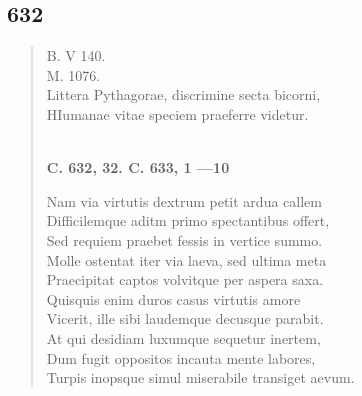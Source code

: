 \documentclass[11pt, a4paper]{report}
\begin{document}
            \subsection*{632}
      \begin{verse}
      B. V 140. \\ M. 1076. \\ Littera Pythagorae, discrimine secta bicorni, \\ HIumanae vitae speciem praeferre videtur. \\ 
        ﻿\pagebreak 
    \begin{center} \textbf{C. 632, 32. C. 633, 1 —10} \end{center} \marginpar{[99]} Nam via virtutis dextrum petit ardua callem \\ Difficilemque aditm primo spectantibus offert, \\ Sed requiem praebet fessis in vertice summo. \\ Molle ostentat iter via laeva, sed ultima meta \\ Praecipitat captos volvitque per aspera saxa. \\ Quisquis enim duros casus virtutis amore \\ Vicerit, ille sibi laudemque decusque parabit. \\ At qui desidiam luxumque sequetur inertem, \\ Dum fugit oppositos incauta mente labores, \\ Turpis inopsque simul miserabile transiget aevum. \\ 
      \end{verse}
  
\end{document}
